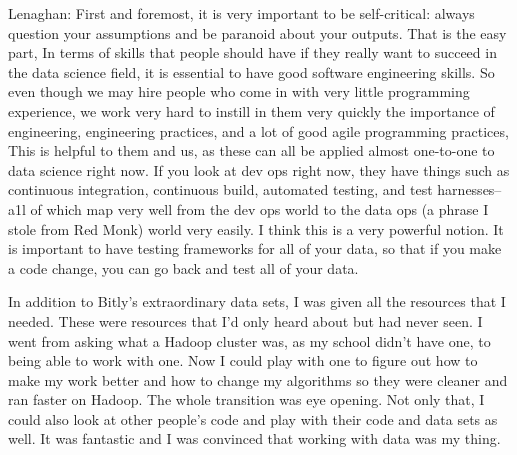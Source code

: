 Lenaghan: First and foremost, it is very important
to be self-critical: always question your assumptions
and be paranoid about your outputs. That is the easy
part, In terms of skills that people should have if they
really want to succeed in the data science ﬁeld, it is
essential to have good software engineering skills. So
even though we may hire people who come in with
very little programming experience, we work very
hard to instill in them very quickly the importance of
engineering, engineering practices, and a lot of good
agile programming practices, This is helpful to them
and us, as these can all be applied almost one-to-one
to data science right now.
If you look at dev ops right now, they have things
such as continuous integration, continuous build,
automated testing, and test harnesses-- a1l of which
map very well from the dev ops world to the data ops
(a phrase I stole from Red Monk) world very easily. I
think this is a very powerful notion. It is important to
have testing frameworks for all of your data, so that if
you make a code change, you can go back and test all
of your data. %


In addition to Bitly’s extraordinary data sets, I was
given all the resources that I needed. These were
resources that I’d only heard about but had never
seen. I went from asking what a Hadoop cluster was,
as my school didn't have one, to being able to work
with one. Now I could play with one to figure out how
to make my work better and how to change my
algorithms so they were cleaner and ran faster on
Hadoop. The whole transition was eye opening. Not
only that, I could also look at other people’s code and
play with their code and data sets as well. It was
fantastic and I was convinced that working with data
was my thing.
